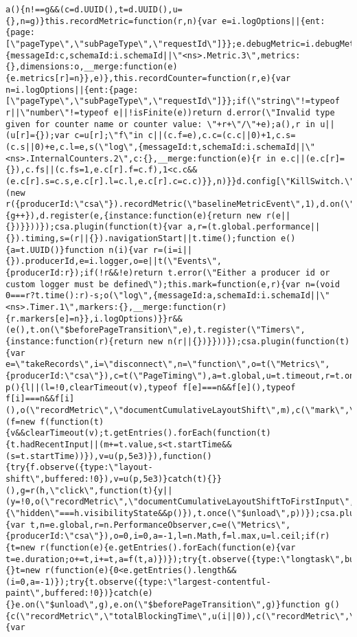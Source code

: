 \documentclass[
]{article}
\begin{document}
\begin{verbatim}
a(){n!==g&&(c=d.UUID(),t=d.UUID(),u={},n=g)}this.recordMetric=function(r,n){var e=i.logOptions||{ent:{page:[\"pageType\",\"subPageType\",\"requestId\"]}};e.debugMetric=i.debugMetric,a(),s(\"log\",{messageId:c,schemaId:i.schemaId||\"<ns>.Metric.3\",metrics:{},dimensions:o,__merge:function(e){e.metrics[r]=n}},e)},this.recordCounter=function(r,e){var n=i.logOptions||{ent:{page:[\"pageType\",\"subPageType\",\"requestId\"]}};if(\"string\"!=typeof r||\"number\"!=typeof e||!isFinite(e))return d.error(\"Invalid type given for counter name or counter value: \"+r+\"/\"+e);a(),r in u||(u[r]={});var c=u[r];\"f\"in c||(c.f=e),c.c=(c.c||0)+1,c.s=(c.s||0)+e,c.l=e,s(\"log\",{messageId:t,schemaId:i.schemaId||\"<ns>.InternalCounters.2\",c:{},__merge:function(e){r in e.c||(e.c[r]={}),c.fs||(c.fs=1,e.c[r].f=c.f),1<c.c&&(e.c[r].s=c.s,e.c[r].l=c.l,e.c[r].c=c.c)}},n)}}d.config[\"KillSwitch.\"+e]||(new r({producerId:\"csa\"}).recordMetric(\"baselineMetricEvent\",1),d.on(\"$beforePageTransition\",function(){g++}),d.register(e,{instance:function(e){return new r(e||{})}}))});csa.plugin(function(t){var a,r=(t.global.performance||{}).timing,s=(r||{}).navigationStart||t.time();function e(){a=t.UUID()}function n(i){var r=(i=i||{}).producerId,e=i.logger,o=e||t(\"Events\",{producerId:r});if(!r&&!e)return t.error(\"Either a producer id or custom logger must be defined\");this.mark=function(e,r){var n=(void 0===r?t.time():r)-s;o(\"log\",{messageId:a,schemaId:i.schemaId||\"<ns>.Timer.1\",markers:{},__merge:function(r){r.markers[e]=n}},i.logOptions)}}r&&(e(),t.on(\"$beforePageTransition\",e),t.register(\"Timers\",{instance:function(r){return new n(r||{})}}))});csa.plugin(function(t){var e=\"takeRecords\",i=\"disconnect\",n=\"function\",o=t(\"Metrics\",{producerId:\"csa\"}),c=t(\"PageTiming\"),a=t.global,u=t.timeout,r=t.on,f=a.PerformanceObserver,m=0,l=!1,s=0,d=a.performance,h=a.document,v=null,y=!1,g=t.blank;function p(){l||(l=!0,clearTimeout(v),typeof f[e]===n&&f[e](),typeof f[i]===n&&f[i](),o(\"recordMetric\",\"documentCumulativeLayoutShift\",m),c(\"mark\",\"cumulativeLayoutShiftLastTimestamp\",Math.floor(s+d.timing.navigationStart)))}f&&d&&d.timing&&h&&(f=new f(function(t){v&&clearTimeout(v);t.getEntries().forEach(function(t){t.hadRecentInput||(m+=t.value,s<t.startTime&&(s=t.startTime))}),v=u(p,5e3)}),function(){try{f.observe({type:\"layout-shift\",buffered:!0}),v=u(p,5e3)}catch(t){}}(),g=r(h,\"click\",function(t){y||(y=!0,o(\"recordMetric\",\"documentCumulativeLayoutShiftToFirstInput\",m),g())}),r(h,\"visibilitychange\",function(){\"hidden\"===h.visibilityState&&p()}),t.once(\"$unload\",p))});csa.plugin(function(e){var t,n=e.global,r=n.PerformanceObserver,c=e(\"Metrics\",{producerId:\"csa\"}),o=0,i=0,a=-1,l=n.Math,f=l.max,u=l.ceil;if(r){t=new r(function(e){e.getEntries().forEach(function(e){var t=e.duration;o+=t,i+=t,a=f(t,a)})});try{t.observe({type:\"longtask\",buffered:!0})}catch(e){}t=new r(function(e){0<e.getEntries().length&&(i=0,a=-1)});try{t.observe({type:\"largest-contentful-paint\",buffered:!0})}catch(e){}e.on(\"$unload\",g),e.on(\"$beforePageTransition\",g)}function g(){c(\"recordMetric\",\"totalBlockingTime\",u(i||0)),c(\"recordMetric\",\"totalBlockingTimeInclLCP\",u(o||0)),c(\"recordMetric\",\"maxBlockingTime\",u(a||0)),i=o=0,a=-1}});csa.plugin(function(r){var 
\end{verbatim}
\end{document}
